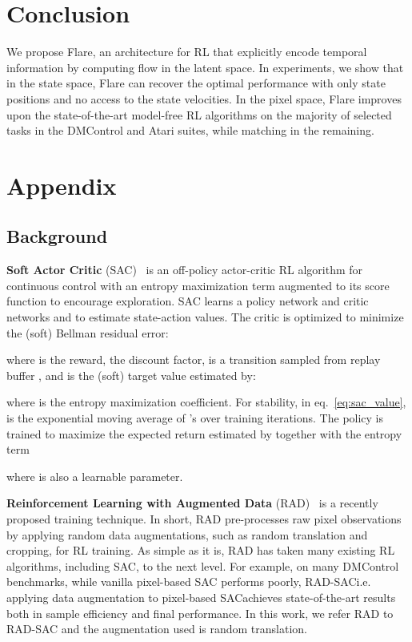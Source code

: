 \documentclass{article} \usepackage{iclr2021_conference,times}
\begin{document}
\section{Conclusion}
We propose Flare, an architecture for RL that explicitly encode temporal information by computing flow in the latent space. In experiments, we show that in the state space, Flare can recover the optimal performance with only state positions and no access to the state velocities. In the pixel space, Flare improves upon the state-of-the-art model-free RL algorithms on the majority of selected tasks in the DMControl and Atari suites, while matching in the remaining. 


\appendix
\newpage
\section{Appendix}
\subsection{Background}\label{sec:background}


    \textbf{Soft Actor Critic} (SAC)~\citep{haarnoja2018soft} is an off-policy actor-critic RL algorithm for continuous control with an entropy maximization term augmented to its score function to encourage exploration. SAC learns a policy network  and critic networks  and  to estimate state-action values. 
The critic  is optimized to minimize the (soft) Bellman residual error:
    
    where  is the reward,  the discount factor,  is a transition sampled from replay buffer , and  is the (soft) target value estimated by:
    
    where  is the entropy maximization coefficient. 
For stability, in eq.~\ref{eq:sac_value},  is the exponential moving average of 's over training iterations.  The policy  is trained to maximize the expected return estimated by  together with the entropy term

    where  is also a learnable parameter. 


\textbf{Reinforcement Learning with Augmented Data} (RAD)~\citep{laskin_lee2020rad} is a recently proposed training technique. In short, RAD pre-processes raw pixel observations by applying random data augmentations, such as random translation and cropping, for RL training.
As simple as it is, RAD has taken many existing RL algorithms, including SAC, to the next level. 
For example, on many DMControl~\citep{tassa2018deepmind} benchmarks, while vanilla pixel-based SAC performs poorly, RAD-SAC\textemdash i.e. applying data augmentation to pixel-based SAC\textemdash achieves state-of-the-art results both in sample efficiency and final performance. 
In this work, we refer RAD to RAD-SAC and the augmentation used is random translation. 
\end{document}
